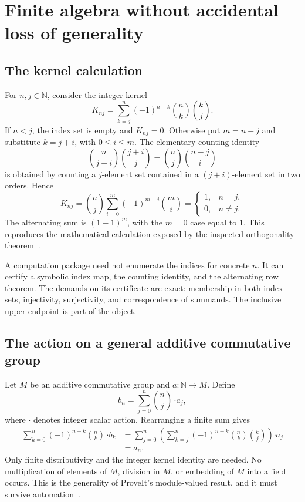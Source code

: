 \documentclass[11pt,a4paper]{article}
\newcommand{\N}{\mathbb N}
\theoremstyle{remark}
\begin{document}
\section{Finite algebra without accidental loss of generality}
\label{sec:binomial}
\subsection{The kernel calculation}
For $n,j\in\N$, consider the integer kernel
\[
 K_{nj}=\sum_{k=j}^{n}(-1)^{n-k}\binom nk\binom kj.
\]
If $n<j$, the index set is empty and $K_{nj}=0$. Otherwise put $m=n-j$ and
substitute $k=j+i$, with $0\le i\le m$. The elementary counting identity
\[
 \binom n{j+i}\binom{j+i}j=\binom nj\binom{n-j}i
\]
is obtained by counting a $j$-element set contained in a $(j+i)$-element set in
two orders. Hence
\[
 K_{nj}=\binom nj\sum_{i=0}^{m}(-1)^{m-i}\binom mi
       =\begin{cases}1,&n=j,\\0,&n\ne j.\end{cases}
\]
The alternating sum is $(1-1)^m$, with the $m=0$ case equal to $1$.
This reproduces the mathematical calculation exposed by the inspected
orthogonality theorem~\cite{pbinomial}.

A computation package need not enumerate the indices for concrete $n$.
It can certify a symbolic index map, the counting identity, and the alternating
row theorem. The demands on its certificate are exact: membership in both index
sets, injectivity, surjectivity, and correspondence of summands. The inclusive
upper endpoint is part of the object.

\subsection{The action on a general additive commutative group}
Let $M$ be an additive commutative group and $a:\N\to M$. Define
\[
 b_n=\sum_{j=0}^{n}\binom nj\,\boldsymbol\cdot a_j,
\]
where $\boldsymbol\cdot$ denotes integer scalar action. Rearranging a finite
sum gives
\begin{align*}
 \sum_{k=0}^{n}(-1)^{n-k}\binom nk\,\boldsymbol\cdot b_k
 &=\sum_{j=0}^{n}
   \left(\sum_{k=j}^{n}(-1)^{n-k}\binom nk\binom kj\right)
       \boldsymbol\cdot a_j\\
 &=a_n.
\end{align*}
Only finite distributivity and the integer kernel identity are needed. No
multiplication of elements of $M$, division in $M$, or embedding of $M$ into a
field occurs. This is the generality of ProveIt's module-valued result, and it
must survive automation~\cite{pbinomial}.
\end{document}

